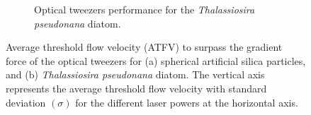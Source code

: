 \documentclass[letterpaper,12pt,oneside]{book}
\begin{document}
\begin{figure}[H]
\begin{subfigure}[b]{0.49\textwidth}
         \caption{Optical tweezers performance for the \textit{Thalassiosira pseudonana} diatom.}
         \label{fig:three sin x}
     \end{subfigure}
     \caption{Average threshold flow velocity (ATFV) to surpass the gradient force of the optical tweezers for (a) spherical artificial silica particles, and (b) \textit{Thalassiosira pseudonana} diatom. The vertical axis represents the average threshold flow velocity with standard deviation $(\sigma)$ for the different laser powers at the horizontal axis.}
     \hfill
    \label{graficasmicrofluidics} 
\end{figure}






\end{document}
